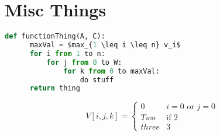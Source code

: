 \documentclass[12pt, letterpaper]{article}
\theoremstyle{definition}
\begin{document}
\section*{Misc Things}

\begin{center}
\end{center}

\begin{lstlisting}[language=Python, mathescape=true]
  def functionThing(A, C):
      maxVal = $max_{1 \leq i \leq n} v_i$
      for i from 1 to n:
          for j from 0 to W:
              for k from 0 to maxVal:
                  do stuff
      return thing
  \end{lstlisting}

\[
    V[i,j,k] = 
    \begin{cases} 
      0 & i = 0 \text{ or } j = 0 \\
      Two & \text{if } 2  \\
      three &  3
   \end{cases}
\]
\end{document}
